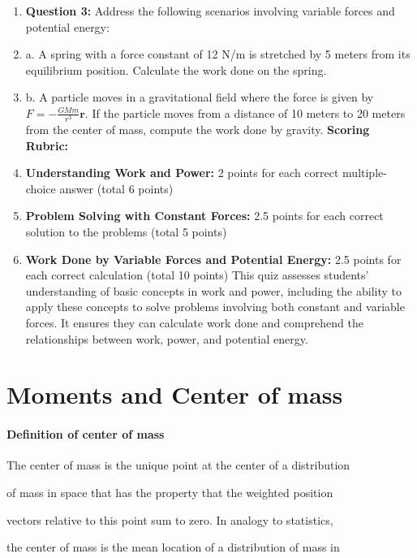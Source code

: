 \begin{enumerate}
    \item \textbf{Question 3:} Address the following scenarios involving variable forces and potential energy:
    \item a. A spring with a force constant of 12 N/m is stretched by 5 meters from its equilibrium position. Calculate the work done on the spring.
    \item b. A particle moves in a gravitational field where the force is given by $F = -\frac{GMm}{r^3}\mathbf{r}$. If the particle moves from a distance of 10 meters to 20 meters from the center of mass, compute the work done by gravity. \textbf{Scoring Rubric:}
    \item \textbf{Understanding Work and Power:} 2 points for each correct multiple-choice answer (total 6 points)
    \item \textbf{Problem Solving with Constant Forces:} 2.5 points for each correct solution to the problems (total 5 points)
    \item \textbf{Work Done by Variable Forces and Potential Energy:} 2.5 points for each correct calculation (total 10 points) This quiz assesses students' understanding of basic concepts in work and power, including the ability to apply these concepts to solve problems involving both constant and variable forces. It ensures they can calculate work done and comprehend the relationships between work, power, and potential energy.
\end{enumerate}

\section{Moments and Center of mass}
\label{sec:moments-and-center-of-mass}

\paragraph{Definition of center of mass}



The center of mass is the unique point at the center of a distribution

of mass in space that has the property that the weighted position

vectors relative to this point sum to zero. In analogy to statistics,

the center of mass is the mean location of a distribution of mass in

